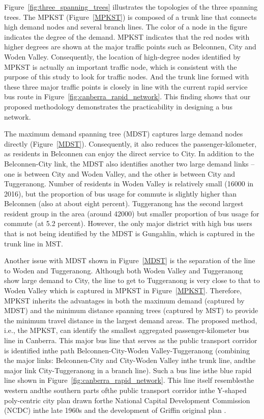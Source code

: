 \documentclass[10pt,english]{article}
\newcommand{\figref}[1]{Figure~\ref{#1}}
\begin{document}
\figref{fig:three_spanning_trees} illustrates the topologies of the three spanning trees. The MPKST (\figref{MPKST}) is composed of a trunk line that connects high demand nodes and several branch lines. The color of a node in the figure indicates the degree of the demand. MPKST indicates that the red nodes with higher degrees are shown at the major traffic points such as Belconnen, City and Woden Valley. Consequently, the location of high-degree nodes identified by MPKST is actually an important traffic node, which is consistent with the purpose of this study to look for traffic nodes. And the trunk line formed with these three major traffic points is closely in line with the current rapid service bus route in \figref{fig:canberra_rapid_network}. This finding shows that our proposed methodology demonstrates the practicability in designing a bus network.

The maximum demand spanning tree (MDST) captures large demand nodes directly (\figref{MDST}). Consequently, it also reduces the passenger-kilometer, as residents in Belconnen can enjoy the direct service to City. In addition to the Belconnen-City link, the MDST also identifies another two large demand links -- one is between City and Woden Valley, and the other is between City and Tuggeranong. Number of residents in Woden Valley is relatively small (16000 in 2016), but the proportion of bus usage for commute is slightly higher than Belconnen (also at about eight percent). Tuggeranong has the second largest resident group in the area (around 42000) but smaller proportion of bus usage for commute (at 5.2 percent). However, the only major district with high bus users that is not being identified by the MDST is Gungahlin, which is captured in the trunk line in MST.

Another issue with MDST shown in \figref{MDST} is the separation of the line to Woden and Tuggeranong. Although both Woden Valley and Tuggeranong show large demand to City, the line to get to Tuggeranong is very close to that to Woden Valley which is captured in MPKST in \figref{MPKST}. Therefore, MPKST inherits the advantages in both the maximum demand (captured by MDST) and the minimum distance spanning trees (captured by MST) to provide the minimum travel distance in the largest demand areas. The proposed method, i.e., the MPKST, can identify the smallest aggregated passenger-kilometer bus line in Canberra. This major bus line that serves as the public transport corridor is identified inthe path Belconnen-City-Woden Valley-Tuggeranong (combining the major links: Belconnen-City and City-Woden Valley inthe trunk line, andthe major link City-Tuggeranong in a branch line). Such a bus line isthe blue rapid line shown in \figref{fig:canberra_rapid_network}. This line itself resemblesthe western andthe southern parts ofthe public transport corridor inthe Y-shaped poly-centric city plan drawn forthe National Capital Development Commission (NCDC) inthe late 1960s and the development of Griffin original plan \citep{Wensing2013}.
\end{document}
